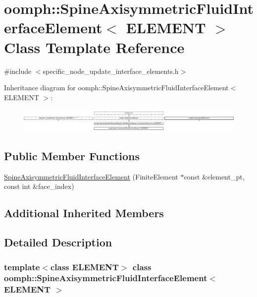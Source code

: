 \hypertarget{classoomph_1_1SpineAxisymmetricFluidInterfaceElement}{}\section{oomph\+:\+:Spine\+Axisymmetric\+Fluid\+Interface\+Element$<$ E\+L\+E\+M\+E\+NT $>$ Class Template Reference}
\label{classoomph_1_1SpineAxisymmetricFluidInterfaceElement}


{\ttfamily \#include $<$specific\+\_\+node\+\_\+update\+\_\+interface\+\_\+elements.\+h$>$}

Inheritance diagram for oomph\+:\+:Spine\+Axisymmetric\+Fluid\+Interface\+Element$<$ E\+L\+E\+M\+E\+NT $>$\+:\begin{figure}[H]
\begin{center}
\leavevmode
\includegraphics[height=1.212121cm]{classoomph_1_1SpineAxisymmetricFluidInterfaceElement}
\end{center}
\end{figure}
\subsection*{Public Member Functions}
\begin{DoxyCompactItemize}
\item 
\hyperlink{classoomph_1_1SpineAxisymmetricFluidInterfaceElement_a66aaa2581711338cf66660d97663d7cb}{Spine\+Axisymmetric\+Fluid\+Interface\+Element} (Finite\+Element $\ast$const \&element\+\_\+pt, const int \&face\+\_\+index)
\end{DoxyCompactItemize}
\subsection*{Additional Inherited Members}


\subsection{Detailed Description}
\subsubsection*{template$<$class E\+L\+E\+M\+E\+NT$>$\newline
class oomph\+::\+Spine\+Axisymmetric\+Fluid\+Interface\+Element$<$ E\+L\+E\+M\+E\+N\+T $>$}



